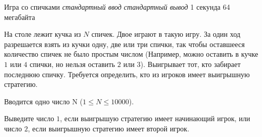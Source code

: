 \begin{problem}%
{Игра со спичками}%
{\textsl{стандартный ввод}}%
{\textsl{стандартный вывод}}%
{1 секунда}%
{64 мегабайта}{}

На столе лежит кучка из $N$ спичек. Двое играют в такую игру. За один ход разрешается взять из кучки одну, две или три спички, так чтобы оставшееся количество спичек не было простым числом (Например, можно оставить в кучке $1$ или $4$ спички, но нельзя оставить $2$ или $3$). Выигрывает тот, кто забирает последнюю спичку. Требуется определить, кто из игроков имеет выигрышную стратегию.

\InputFile

Вводится одно число N ($1 \le N \le 10000$).

\OutputFile

Выведите число $1$, если выигрышую стратегию имеет начинающий игрок, или число $2$, если выигрышную стратегию имеет второй игрок.

\Examples

\begin{example}
%
\end{example}
\end{problem}
